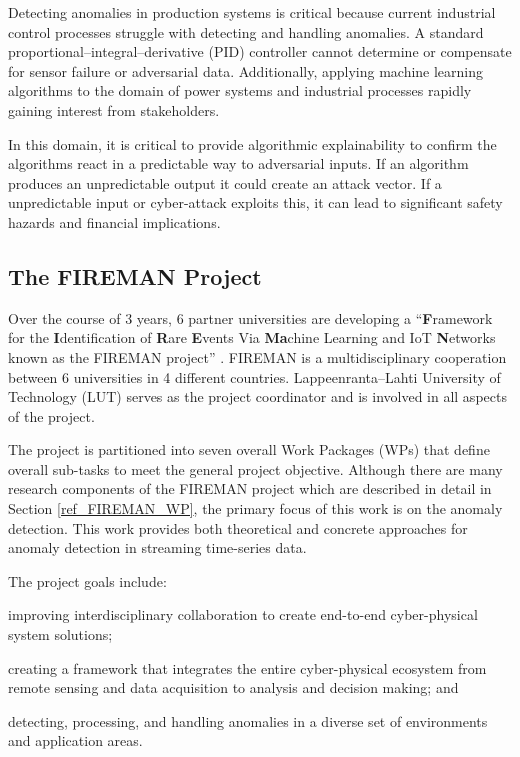 Detecting anomalies in production systems is critical because current industrial control processes struggle with detecting and handling anomalies. A standard proportional–integral–derivative (PID) controller cannot determine or compensate for sensor failure or adversarial data. Additionally, applying machine learning algorithms to the domain of power systems and industrial processes rapidly gaining interest from stakeholders.

In this domain, it is critical to provide algorithmic explainability to confirm the algorithms react in a predictable way to adversarial inputs. If an algorithm produces an unpredictable output it could create an attack vector. If a unpredictable input or cyber-attack exploits this, it can lead to significant safety hazards and financial implications.


\subsection{The FIREMAN Project}

Over the course of 3 years, 6 partner universities are developing a \enquote{\textbf{F}ramework for the \textbf{I}dentification of \textbf{R}are \textbf{E}vents Via \textbf{Ma}chine Learning and IoT \textbf{N}etworks known as the FIREMAN project} \parencite{fireman-homepage}. FIREMAN is a multidisciplinary cooperation between 6 universities in 4 different countries. Lappeenranta--Lahti University of Technology (LUT) serves as the project coordinator and is involved in all aspects of the project.

The project is partitioned into seven overall Work Packages (WPs) that define overall sub-tasks to meet the general project objective.
Although there are many research components of the FIREMAN project which are described in detail in Section \ref{ref_FIREMAN_WP}, the primary focus of this work is on the anomaly detection. This work provides both theoretical and concrete approaches for anomaly detection in streaming time-series data.

The project goals include:
\begin{inlinelist}
    \item improving interdisciplinary collaboration to create end-to-end cyber-physical system solutions;
    \item creating a framework that integrates the entire cyber-physical ecosystem from remote sensing and data acquisition to analysis and decision making; and
    \item detecting, processing, and handling anomalies in a diverse set of environments and application areas.
\end{inlinelist}


